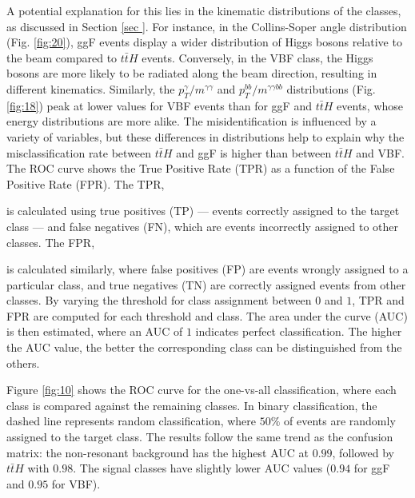 A potential explanation for this lies in the kinematic distributions of the classes, as discussed in Section \ref{sec
}. For instance, in the Collins-Soper angle distribution (Fig. \ref{fig:20}), ggF events display a wider distribution of Higgs bosons relative to the beam compared to $t \bar{t}H$ events.
Conversely, in the VBF class, the Higgs bosons are more likely to be radiated along the beam direction, resulting in different kinematics. Similarly, the $p_T^{\gamma}/m^{\gamma \gamma}$ and
$p_T^{bb}/m^{\gamma \gamma bb}$ distributions (Fig. \ref{fig:18}) peak at lower values for VBF events than for ggF and $t \bar{t}H$ events, whose energy distributions are more alike.
The misidentification is influenced by a variety of variables, but these differences in distributions help to explain why the misclassification rate between $t \bar{t}H$ and ggF is higher than between $t \bar{t}H$ and VBF. \\

The ROC curve shows the True Positive Rate (TPR) as a function of the False Positive Rate (FPR). The TPR,


is calculated using true positives (TP) — events correctly assigned to the target class — and false negatives (FN), which are events incorrectly assigned to other classes. The FPR,


is calculated similarly, where false positives (FP) are events wrongly assigned to a particular class, and true negatives (TN) are correctly assigned events from other classes.
By varying the threshold for class assignment between $0$ and $1$, TPR and FPR are computed for each threshold and class. The area under the curve (AUC) is then estimated, where an AUC of $1$
indicates perfect classification. The higher the AUC value, the better the corresponding class can be distinguished from the others.


Figure \ref{fig:10} shows the ROC curve for the one-vs-all classification, where each class is compared against the remaining classes.
In binary classification, the dashed line represents random classification, where $50\%$ of events are randomly assigned to the target class. The results follow the same trend as the confusion matrix:
the non-resonant background has the highest AUC at $0.99$, followed by $t \bar{t}H$ with $0.98$. The signal classes have slightly lower AUC values ($0.94$ for ggF and $0.95$ for VBF). \\

